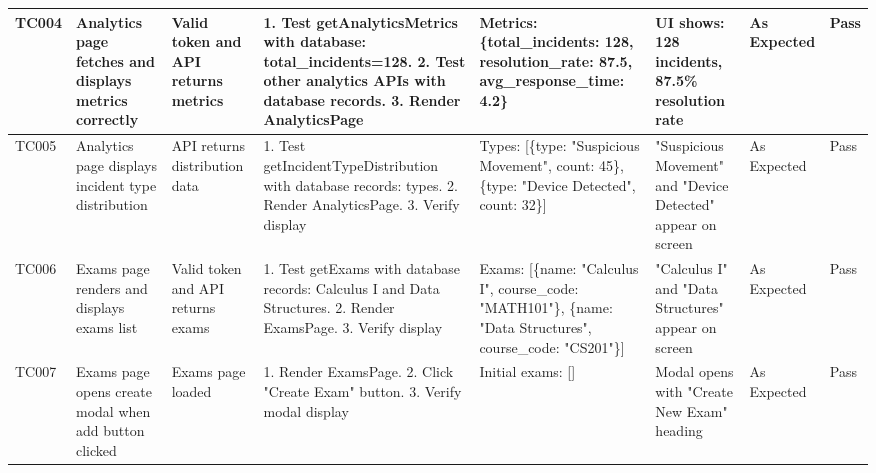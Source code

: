 \begin{table}[H]
{\begin{tabular}{|p{0.8cm}|p{1.8cm}|p{1.5cm}|p{2.5cm}|p{1.5cm}|p{2cm}|p{1.2cm}|p{0.8cm}|}
        \hline
        TC004 & Analytics page fetches and displays metrics correctly & Valid token and API returns metrics & 1. Test getAnalyticsMetrics with database: total\_incidents=128. 
        2. Test other analytics APIs with database records. 
        3. Render AnalyticsPage & Metrics: \{total\_incidents: 128, resolution\_rate: 87.5, avg\_response\_time: 4.2\} & UI shows: 128 incidents, 87.5\% resolution rate & As Expected & Pass \\
        \hline
        TC005 & Analytics page displays incident type distribution & API returns distribution data & 1. Test getIncidentTypeDistribution with database records: types. 
        2. Render AnalyticsPage. 
        3. Verify display & Types: [\{type: "Suspicious Movement", count: 45\}, \{type: "Device Detected", count: 32\}] & "Suspicious Movement" and "Device Detected" appear on screen & As Expected & Pass \\
        \hline
        TC006 & Exams page renders and displays exams list & Valid token and API returns exams & 1. Test getExams with database records: Calculus I and Data Structures. 
        2. Render ExamsPage. 
        3. Verify display & Exams: [\{name: "Calculus I", course\_code: "MATH101"\}, \{name: "Data Structures", course\_code: "CS201"\}] & "Calculus I" and "Data Structures" appear on screen & As Expected & Pass \\
        \hline
        TC007 & Exams page opens create modal when add button clicked & Exams page loaded & 1. Render ExamsPage. 
        2. Click "Create Exam" button. 
        3. Verify modal display & Initial exams: [] & Modal opens with "Create New Exam" heading & As Expected & Pass \\
        \hline
    \end{tabular}%
    }
\end{table}
